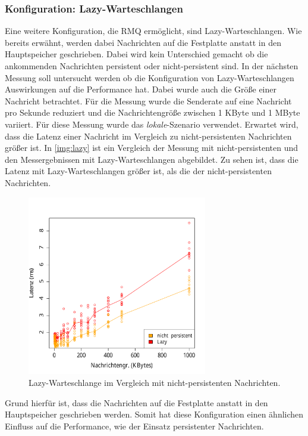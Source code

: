 \subsubsection{Konfiguration: Lazy-Warteschlangen}
\label{sec:rmqLazy}
Eine weitere Konfiguration, die RMQ ermöglicht, sind Lazy-Warteschlangen. Wie bereits erwähnt, werden dabei Nachrichten auf die Festplatte anstatt in den Hauptspeicher geschrieben. Dabei wird kein Unterschied gemacht ob die ankommenden Nachrichten persistent oder nicht-persistent sind. In der nächsten Messung soll untersucht werden ob die Konfiguration von Lazy-Warteschlangen Auswirkungen auf die Performance hat. Dabei wurde auch die Größe einer Nachricht betrachtet. Für die Messung wurde die Senderate auf eine Nachricht pro Sekunde reduziert und die Nachrichtengröße zwischen 1 KByte und 1 MByte variiert. Für diese Messung wurde das \textit{lokale}-Szenario verwendet. Erwartet wird, dass die Latenz einer Nachricht im Vergleich zu nicht-persistenten Nachrichten größer ist. 
In \autoref{img:lazy} ist ein Vergleich der Messung mit nicht-persistenten und den Messergebnissen mit Lazy-Warteschlangen abgebildet. Zu sehen ist, dass die Latenz mit Lazy-Warteschlangen größer ist, als die der nicht-persistenten Nachrichten.
\begin{figure}
\center
  \includegraphics[width=0.7\textwidth]{images/measurement/lazy-queues.pdf}
  \caption{Lazy-Warteschlange im Vergleich mit nicht-persistenten Nachrichten.}
  \label{img:lazy}
\end{figure}
Grund hierfür ist, dass die Nachrichten auf die Festplatte anstatt in den Hauptspeicher geschrieben werden. Somit hat diese Konfiguration einen ähnlichen Einfluss auf die Performance, wie der Einsatz persistenter Nachrichten.



